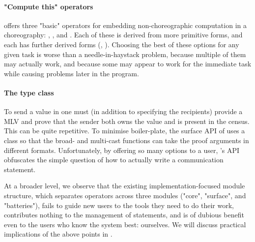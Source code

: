 \paragraph{"Compute this" operators}
\MultiChor offers three "basic" operators for embedding non-choreographic computation in a choreography:
, , and .
Each of these is derived from more primitive forms, and each has further derived forms
(\eg {}, ).
Choosing the best of these options for any given task is worse than a needle-in-haystack problem,
because multiple of them may actually work,
and because some may appear to work for the immediate task while causing problems later in the program.

\paragraph{The  type class}
To send a value in \MultiChor one must (in addition to specifying the recipients)
provide a MLV and prove that the sender both owns the value and is present in the census.
This can be quite repetitive.
To minimise boiler-plate, the surface API of \MultiChor uses a class 
so that the broad- and multi-cast functions can take the proof arguments in different formats.
Unfortunately, by offering so many options to a user, \MultiChor's API obfuscates the simple question of how to actually write a communication statement.

At a broader level, we observe that the existing implementation-focused module structure,
which separates operators across three modules ("core", "surface", and "batteries"),
fails to guide new users to the tools they need to do their work,
contributes nothing to the management of  statements,
and is of dubious benefit even to the users who know the system best: ourselves.
We will discuss practical implications of the above points in .




